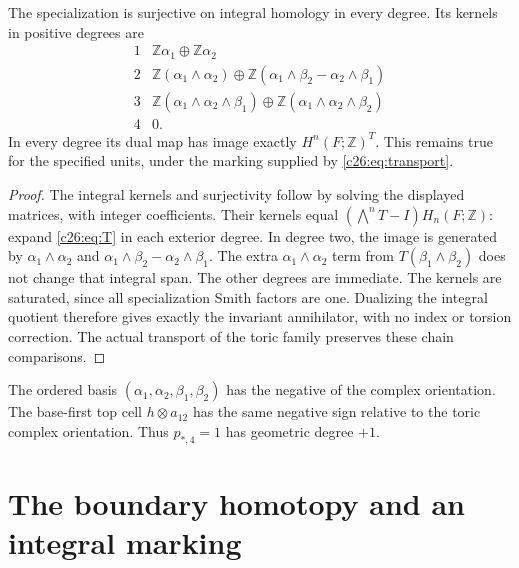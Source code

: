 \begin{theorem}\label{c26:thm:integral}
The specialization is surjective on integral homology in every degree.
Its kernels in positive degrees are
\[
\begin{array}{c|l}
1&\mathbb Z\alpha_1\oplus\mathbb Z\alpha_2\\
2&\mathbb Z(\alpha_1\wedge\alpha_2)\oplus
\mathbb Z(\alpha_1\wedge\beta_2-\alpha_2\wedge\beta_1)\\
3&\mathbb Z(\alpha_1\wedge\alpha_2\wedge\beta_1)\oplus
\mathbb Z(\alpha_1\wedge\alpha_2\wedge\beta_2)\\
4&0.
\end{array}
\]
In every degree its dual map has image exactly
$H^n(F;\mathbb Z)^T$. This remains true for the specified units,
under the marking supplied by \eqref{c26:eq:transport}.
\end{theorem}
\begin{proof}
The integral kernels and surjectivity follow by solving the displayed
matrices, with integer coefficients. Their kernels equal
$(\bigwedge^nT-I)H_n(F;\mathbb Z)$: expand \eqref{c26:eq:T} in each
exterior degree. In degree two, the image is generated by
$\alpha_1\wedge\alpha_2$ and
$\alpha_1\wedge\beta_2-\alpha_2\wedge\beta_1$.
The extra $\alpha_1\wedge\alpha_2$ term from $T(\beta_1\wedge\beta_2)$
does not change that integral span. The other degrees are immediate.
The kernels are saturated, since all specialization Smith factors are one.
Dualizing the integral quotient therefore gives exactly the invariant
annihilator, with no index or torsion correction.
The actual transport of the toric family preserves these chain comparisons.
\end{proof}

The ordered basis $(\alpha_1,\alpha_2,\beta_1,\beta_2)$ has the negative
of the complex orientation. The base-first top cell
$h\otimes a_{12}$ has the same negative sign relative to the toric
complex orientation. Thus $p_{*,4}=1$ has geometric degree $+1$.

\section{The boundary homotopy and an integral marking}

